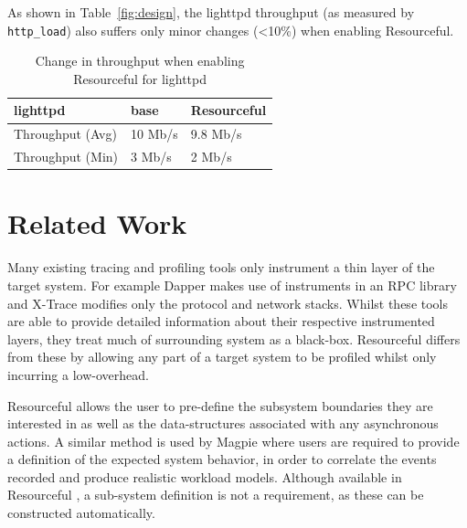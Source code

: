 \documentclass[letterpaper,twocolumn,10pt]{article}
\newcommand{\pname}{Resourceful}
\begin{document}
As shown in Table~\ref{fig:design}, the lighttpd throughput (as measured by \texttt{http\_load}) also suffers only minor changes (<10\%) when enabling \pname.

\begin{table}[ht!]
	\centering 
    \begin{tabular}{|l|l|l|}
    \hline
    lighttpd         & base & \pname \\ \hline
    Throughput (Avg) & 10 Mb/s & 9.8 Mb/s\\
    Throughput (Min) & 3 Mb/s  & 2 Mb/s\\ \hline
    \end{tabular}
    \caption{Change in throughput when enabling \pname{ } for lighttpd}
    \label{tbl:throughput} 
\end{table}

\section{Related Work} 




Many existing tracing and profiling tools only instrument a thin layer of the
target system. For example Dapper \cite{dapper} makes use of instruments in an
RPC library and X-Trace \cite{xtrace} modifies only the protocol and network
stacks. Whilst these tools are able to provide detailed information about their
respective instrumented layers, they treat much of surrounding system as a
black-box. \pname{ } differs from these by allowing any part of a target system
to be profiled whilst only incurring a low-overhead.  

\pname{ } allows the user to pre-define the subsystem boundaries they are
interested in as well as the data-structures associated with any asynchronous
actions. A similar method is used by Magpie \cite{magpieosdi} where users are
required to provide a definition of the expected system behavior, in order to
correlate the events recorded and produce realistic workload models. Although
available in \pname{ }, a sub-system definition is not a requirement, as these
can be constructed automatically. 
\end{document}

